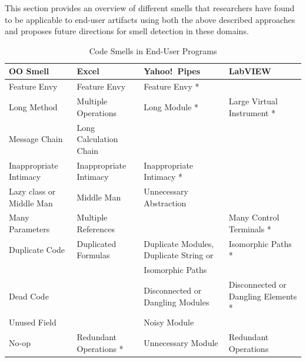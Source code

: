 \documentclass{sig-alternate}
\renewcommand*\cmidrule{\midrule[0.001em]} %
\begin{document}
This section provides an overview of different smells that researchers have found to be applicable to end-user artifacts using both the above described approaches and proposes future directions for smell detection in these domains. 

\begin{table}
\caption{Code Smells in End-User Programs
\label{table:oosmellslarge}}
\centering
\sffamily
\begin{tabular} {@{}llll@{}}
\toprule
\textbf{OO Smell}
	& \textbf{Excel}
	& \textbf{Yahoo!\ Pipes}
	& \textbf{LabVIEW}
\\ \midrule
Feature Envy
	& Feature Envy \cite{Hermans2012inter}
	& Feature Envy *
	& ~~ 
\\ \cmidrule
Long Method
	& Multiple Operations \cite{Hermans2012intra}
	& Long Module *
	& Large Virtual Instrument *
\\ \cmidrule
Message Chain
	& Long Calculation Chain \cite{Hermans2012intra}
	& 
	& 
\\ \cmidrule
Inappropriate Intimacy
	& Inappropriate Intimacy \cite{Hermans2012inter}
	& Inappropriate Intimacy *
	& ~~ 
\\ \cmidrule
Lazy class or Middle Man
	& Middle Man \cite{Hermans2012inter}
	& Unnecessary Abstraction \cite{StoleeTSE2013}
	& ~~ 
\\ \cmidrule
Many Parameters
	& Multiple References \cite{Hermans2012intra}
	& 
	& Many Control Terminals *
\\ \cmidrule
Duplicate Code
	& Duplicated Formulas \cite{Hermans2012intra}
	& Duplicate Modules, Duplicate String or
	& Isomorphic Paths *
\\ %
& 
& Isomorphic Paths \cite{StoleeTSE2013}
& 
\\ \cmidrule
Dead Code
	& ~\ding{55}
	& Disconnected or Dangling Modules \cite{StoleeTSE2013}
	& Disconnected or Dangling Elements *
\\ \cmidrule
Unused Field
	& ~\ding{55}
	& Noisy Module \cite{StoleeTSE2013}
	&
\\ \cmidrule
No-op
	& Redundant Operations *
	& Unnecessary Module \cite{StoleeTSE2013}
	& Redundant Operations \cite{chambers2013smell}

\end{tabular}
\end{table}
\end{document}
